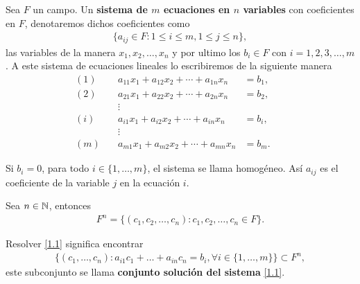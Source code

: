 \documentclass[12pt,a4paper]{book}
\begin{document}
    \begin{definicion}
        Sea $F$ un campo. Un \textbf{sistema de $m$ ecuaciones en $n$ variables} con coeficientes en $F$, denotaremos dichos coeficientes como
        \begin{align*}
            \{a_{ij} \in F : 1 \leq i \leq m, 1 \leq j \leq n\},
        \end{align*}
        las variables de la manera $x_1, x_2, \dots , x_n$ y por ultimo los $b_i \in F$ con $i = 1, 2, 3,\dots , m$. A este sistema de ecuaciones lineales lo escribiremos de la siguiente manera
        \begin{equation}
            \begin{alignedat}{3}
                (1)\quad & a_{11}x_1 + a_{12}x_2 + \cdots + a_{1n}x_n & =  b_1,\\
                (2)\quad & a_{21}x_1 + a_{22}x_2 + \cdots + a_{2n}x_n & =  b_2,\\
                &\vdots   &                                  &   &      \\
                (i)\quad & a_{i1}x_1 + a_{i2}x_2 + \cdots + a_{in}x_n & =  b_i,\\
                &\vdots   &                                  &   &      \\
                (m)\quad & a_{m1}x_1 + a_{m2}x_2 + \cdots + a_{mn}x_n & =  b_m.
            \end{alignedat}
            \tag{1.1}
            \label{1.1}
        \end{equation}
    \end{definicion}
    
    Si $b_i = 0$, para todo $i \in \{ 1, \dots , m \}$, el sistema se llama homogéneo. Así $a_{ij}$ es el coeficiente de la variable $j$ en la ecuación $i$.
    
    Sea $n \in \mathbb{N}$, entonces
    \begin{align*}
        F^n = \{ (c_1, c_2, \dots , c_n): c_1, c_2, \dots , c_n \in F \}.
    \end{align*}
    
    \begin{definicion}
        Resolver \eqref{1.1} significa encontrar
        \begin{align*}
            \{ (c_1, \dots , c_n):a_{i1}c_1 + \dots + a_{in}c_n = b_i, \forall i \in \{1,\dots , m \}\} \subset F^n,
        \end{align*}
        este subconjunto se llama \textbf{conjunto solución del sistema} \eqref{1.1}.
    \end{definicion}
\end{document}
